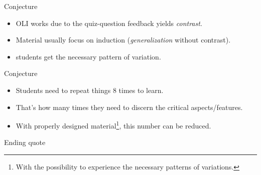 \begin{frame}
  \begin{alertblock}{Conjecture}
    \begin{itemize}
      \item OLI works due to the quiz-question feedback yields \emph{contrast}.
      \item Material usually focus on induction (\emph{generalization} without 
        contrast).
      \item \Ie students get the necessary pattern of variation.
    \end{itemize}
  \end{alertblock}
\end{frame}

\begin{frame}
  \begin{alertblock}{Conjecture}
    \begin{itemize}
      \item Students need to repeat things 8 times to learn.
      \item That's how many times they need to discern the critical 
        aspects/features.
      \item With properly designed material\footnote{%
          With the possibility to experience the necessary patterns of 
          variations.
        }, this number can be reduced.
    \end{itemize}
  \end{alertblock}
\end{frame}

\begin{frame}
  \begin{block}{Ending quote}
  \end{block}
\end{frame}

